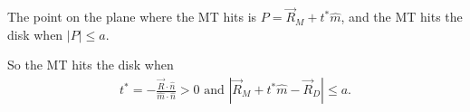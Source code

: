 \documentclass[footheight=20pt, footsepline, headheight=20pt, headsepline]{scrartcl}
\begin{document}
	The point on the plane where the MT hits is $P = \vec{R}_M + t^* \hat{m}$, and the MT hits the disk when $|P| \leq a$.

	So the MT hits the disk when 
	\begin{align}
		t^* = -\frac{\vec{R} \cdot \hat{n}}{\hat{m} \cdot \hat{n}} > 0 \text{ and } |\vec{R}_M + t^* \hat{m} - \vec{R}_D| \leq a.
	\end{align}









\printbibliography
\end{document}
